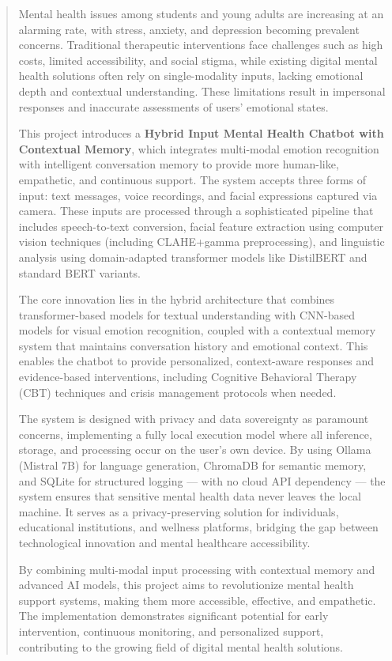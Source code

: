 \documentclass[11pt]{report}
\begin{document}
\begin{abstract}

Mental health issues among students and young adults are increasing at an alarming rate, with stress, anxiety, and depression becoming prevalent concerns. Traditional therapeutic interventions face challenges such as high costs, limited accessibility, and social stigma, while existing digital mental health solutions often rely on single-modality inputs, lacking emotional depth and contextual understanding. These limitations result in impersonal responses and inaccurate assessments of users' emotional states.

This project introduces a \textbf{Hybrid Input Mental Health Chatbot with Contextual Memory}, which integrates multi-modal emotion recognition with intelligent conversation memory to provide more human-like, empathetic, and continuous support. The system accepts three forms of input: text messages, voice recordings, and facial expressions captured via camera. These inputs are processed through a sophisticated pipeline that includes speech-to-text conversion, facial feature extraction using computer vision techniques (including CLAHE+gamma preprocessing), and linguistic analysis using domain-adapted transformer models like DistilBERT and standard BERT variants.

The core innovation lies in the hybrid architecture that combines transformer-based models for textual understanding with CNN-based models for visual emotion recognition, coupled with a contextual memory system that maintains conversation history and emotional context. This enables the chatbot to provide personalized, context-aware responses and evidence-based interventions, including Cognitive Behavioral Therapy (CBT) techniques and crisis management protocols when needed.

The system is designed with privacy and data sovereignty as paramount concerns, implementing a fully local execution model where all inference, storage, and processing occur on the user's own device. By using Ollama (Mistral 7B) for language generation, ChromaDB for semantic memory, and SQLite for structured logging — with no cloud API dependency — the system ensures that sensitive mental health data never leaves the local machine. It serves as a privacy-preserving solution for individuals, educational institutions, and wellness platforms, bridging the gap between technological innovation and mental healthcare accessibility.

\vspace{0.2cm}

By combining multi-modal input processing with contextual memory and advanced AI models, this project aims to revolutionize mental health support systems, making them more accessible, effective, and empathetic. The implementation demonstrates significant potential for early intervention, continuous monitoring, and personalized support, contributing to the growing field of digital mental health solutions.

\end{abstract}
\end{document}
